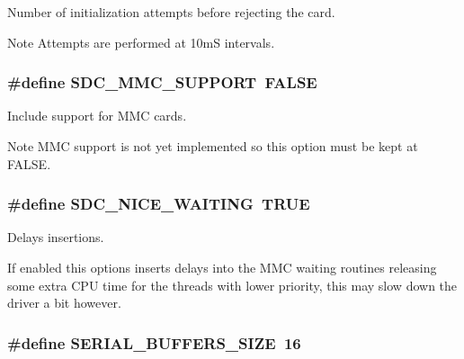 Number of initialization attempts before rejecting the card. 

\begin{DoxyNote}{Note}
Attempts are performed at 10m\+S intervals. 
\end{DoxyNote}
\hypertarget{group__HAL__CONF_ga4f938eff7370feb8de8411e255d21b01}{
\subsubsection[{S\+D\+C\+\_\+\+M\+M\+C\+\_\+\+S\+U\+P\+P\+O\+R\+T}]{\setlength{\rightskip}{0pt plus 5cm}\#define S\+D\+C\+\_\+\+M\+M\+C\+\_\+\+S\+U\+P\+P\+O\+R\+T~F\+A\+L\+S\+E}}\label{group__HAL__CONF_ga4f938eff7370feb8de8411e255d21b01}


Include support for M\+M\+C cards. 

\begin{DoxyNote}{Note}
M\+M\+C support is not yet implemented so this option must be kept at {\ttfamily F\+A\+L\+S\+E}. 
\end{DoxyNote}
\hypertarget{group__HAL__CONF_ga3391c832c171a8606b0fc864766f08ba}{
\subsubsection[{S\+D\+C\+\_\+\+N\+I\+C\+E\+\_\+\+W\+A\+I\+T\+I\+N\+G}]{\setlength{\rightskip}{0pt plus 5cm}\#define S\+D\+C\+\_\+\+N\+I\+C\+E\+\_\+\+W\+A\+I\+T\+I\+N\+G~T\+R\+U\+E}}\label{group__HAL__CONF_ga3391c832c171a8606b0fc864766f08ba}


Delays insertions. 

If enabled this options inserts delays into the M\+M\+C waiting routines releasing some extra C\+P\+U time for the threads with lower priority, this may slow down the driver a bit however. \hypertarget{group__HAL__CONF_ga81a9fb00c7a1ce0fe70f263d8fd820e8}{
\subsubsection[{S\+E\+R\+I\+A\+L\+\_\+\+B\+U\+F\+F\+E\+R\+S\+\_\+\+S\+I\+Z\+E}]{\setlength{\rightskip}{0pt plus 5cm}\#define S\+E\+R\+I\+A\+L\+\_\+\+B\+U\+F\+F\+E\+R\+S\+\_\+\+S\+I\+Z\+E~16}}\label{group__HAL__CONF_ga81a9fb00c7a1ce0fe70f263d8fd820e8}


